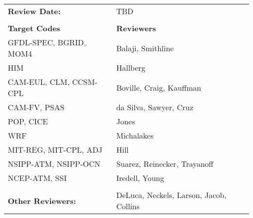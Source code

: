 
\begin{tabular}{l l}

{\bf Review Date:}          & TBD \\ \\

{\bf Target Codes}            & {\bf Reviewers} \\
GFDL-SPEC, BGRID, MOM4        & Balaji, Smithline \\ 
HIM                           & Hallberg \\
CAM-EUL, CLM, CCSM-CPL        & Boville, Craig, Kauffman \\
CAM-FV, PSAS                  & da Silva, Sawyer, Cruz\\
POP, CICE                     & Jones \\
WRF                           & Michalakes \\
MIT-REG, MIT-CPL, ADJ         & Hill \\
NSIPP-ATM, NSIPP-OCN          & Suarez, Reinecker, Trayanoff \\
NCEP-ATM, SSI                 & Iredell, Young \\ \\


{\bf Other Reviewers:}        & DeLuca, Neckels, Larson, Jacob, Collins

\end{tabular}




